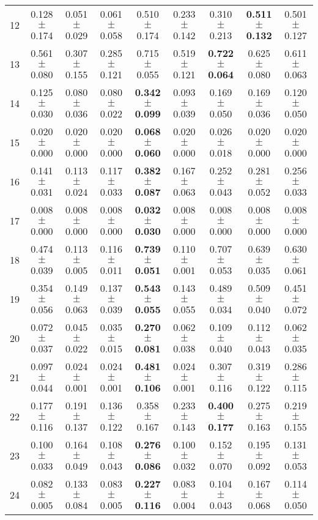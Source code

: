 \begin{table}[!ht]
{\begin{tabular}{r c c c c c c c c}
12 & 0.128 $\pm$ 0.174 & 0.051 $\pm$ 0.029 & 0.061 $\pm$ 0.058 & 0.510 $\pm$ 0.174 & 0.233 $\pm$ 0.142 & 0.310 $\pm$ 0.213 & \textbf{0.511 $\pm$ 0.132} & 0.501 $\pm$ 0.127 \\
13 & 0.561 $\pm$ 0.080 & 0.307 $\pm$ 0.155 & 0.285 $\pm$ 0.121 & 0.715 $\pm$ 0.055 & 0.519 $\pm$ 0.121 & \textbf{0.722 $\pm$ 0.064} & 0.625 $\pm$ 0.080 & 0.611 $\pm$ 0.063 \\
14 & 0.125 $\pm$ 0.030 & 0.080 $\pm$ 0.036 & 0.080 $\pm$ 0.022 & \textbf{0.342 $\pm$ 0.099} & 0.093 $\pm$ 0.039 & 0.169 $\pm$ 0.050 & 0.169 $\pm$ 0.036 & 0.120 $\pm$ 0.050 \\
15 & 0.020 $\pm$ 0.000 & 0.020 $\pm$ 0.000 & 0.020 $\pm$ 0.000 & \textbf{0.068 $\pm$ 0.060} & 0.020 $\pm$ 0.000 & 0.026 $\pm$ 0.018 & 0.020 $\pm$ 0.000 & 0.020 $\pm$ 0.000 \\
16 & 0.141 $\pm$ 0.031 & 0.113 $\pm$ 0.024 & 0.117 $\pm$ 0.033 & \textbf{0.382 $\pm$ 0.087} & 0.167 $\pm$ 0.063 & 0.252 $\pm$ 0.043 & 0.281 $\pm$ 0.052 & 0.256 $\pm$ 0.033 \\
17 & 0.008 $\pm$ 0.000 & 0.008 $\pm$ 0.000 & 0.008 $\pm$ 0.000 & \textbf{0.032 $\pm$ 0.030} & 0.008 $\pm$ 0.000 & 0.008 $\pm$ 0.000 & 0.008 $\pm$ 0.000 & 0.008 $\pm$ 0.000 \\
18 & 0.474 $\pm$ 0.039 & 0.113 $\pm$ 0.005 & 0.116 $\pm$ 0.011 & \textbf{0.739 $\pm$ 0.051} & 0.110 $\pm$ 0.001 & 0.707 $\pm$ 0.053 & 0.639 $\pm$ 0.035 & 0.630 $\pm$ 0.061 \\
19 & 0.354 $\pm$ 0.056 & 0.149 $\pm$ 0.063 & 0.137 $\pm$ 0.039 & \textbf{0.543 $\pm$ 0.055} & 0.143 $\pm$ 0.055 & 0.489 $\pm$ 0.034 & 0.509 $\pm$ 0.040 & 0.451 $\pm$ 0.072 \\
20 & 0.072 $\pm$ 0.037 & 0.045 $\pm$ 0.022 & 0.035 $\pm$ 0.015 & \textbf{0.270 $\pm$ 0.081} & 0.062 $\pm$ 0.038 & 0.109 $\pm$ 0.040 & 0.112 $\pm$ 0.043 & 0.062 $\pm$ 0.035 \\
21 & 0.097 $\pm$ 0.044 & 0.024 $\pm$ 0.001 & 0.024 $\pm$ 0.001 & \textbf{0.481 $\pm$ 0.106} & 0.024 $\pm$ 0.001 & 0.307 $\pm$ 0.116 & 0.319 $\pm$ 0.122 & 0.286 $\pm$ 0.115 \\
22 & 0.177 $\pm$ 0.116 & 0.191 $\pm$ 0.137 & 0.136 $\pm$ 0.122 & 0.358 $\pm$ 0.167 & 0.233 $\pm$ 0.143 & \textbf{0.400 $\pm$ 0.177} & 0.275 $\pm$ 0.163 & 0.219 $\pm$ 0.155 \\
23 & 0.100 $\pm$ 0.033 & 0.164 $\pm$ 0.049 & 0.108 $\pm$ 0.043 & \textbf{0.276 $\pm$ 0.086} & 0.100 $\pm$ 0.032 & 0.152 $\pm$ 0.070 & 0.195 $\pm$ 0.092 & 0.131 $\pm$ 0.053 \\
24 & 0.082 $\pm$ 0.005 & 0.133 $\pm$ 0.084 & 0.083 $\pm$ 0.005 & \textbf{0.227 $\pm$ 0.116} & 0.083 $\pm$ 0.004 & 0.104 $\pm$ 0.043 & 0.167 $\pm$ 0.068 & 0.114 $\pm$ 0.050 \\

\end{tabular}}
\end{table}
